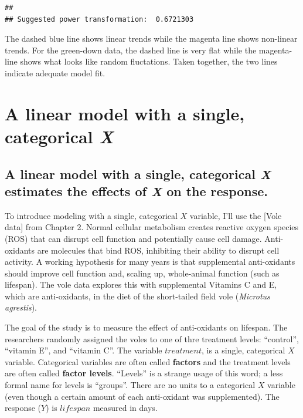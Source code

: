\documentclass[]{book}
\begin{document}
\begin{verbatim}
## 
## Suggested power transformation:  0.6721303
\end{verbatim}

The dashed blue line shows linear trends while the magenta line shows non-linear trends. For the green-down data, the dashed line is very flat while the magenta-line shows what looks like random fluctations. Taken together, the two lines indicate adequate model fit.

\hypertarget{a-linear-model-with-a-single-categorical-x}{%
\chapter{\texorpdfstring{A linear model with a single, categorical \emph{X}}{A linear model with a single, categorical X}}\label{a-linear-model-with-a-single-categorical-x}}

\hypertarget{a-linear-model-with-a-single-categorical-x-estimates-the-effects-of-x-on-the-response.}{%
\section{\texorpdfstring{A linear model with a single, categorical \emph{X} estimates the effects of \emph{X} on the response.}{A linear model with a single, categorical X estimates the effects of X on the response.}}\label{a-linear-model-with-a-single-categorical-x-estimates-the-effects-of-x-on-the-response.}}

To introduce modeling with a single, categorical \(X\) variable, I'll use the {[}Vole data{]} from Chapter 2. Normal cellular metabolism creates reactive oxygen species (ROS) that can disrupt cell function and potentially cause cell damage. Anti-oxidants are molecules that bind ROS, inhibiting their ability to disrupt cell activity. A working hypothesis for many years is that supplemental anti-oxidants should improve cell function and, scaling up, whole-animal function (such as lifespan). The vole data explores this with supplemental Vitamins C and E, which are anti-oxidants, in the diet of the short-tailed field vole (\emph{Microtus agrestis}).

The goal of the study is to measure the effect of anti-oxidants on lifespan. The researchers randomly assigned the voles to one of thre treatment levels: ``control'', ``vitamin E'', and ``vitamin C''. The variable \(treatment\), is a single, categorical \(X\) variable. Categorical variables are often called \textbf{factors} and the treatment levels are often called \textbf{factor levels}. ``Levels'' is a strange usage of this word; a less formal name for levels is ``groups''. There are no units to a categorical \(X\) variable (even though a certain amount of each anti-oxidant was supplemented). The response (\(Y\)) is \(lifespan\) measured in days.
\end{document}
